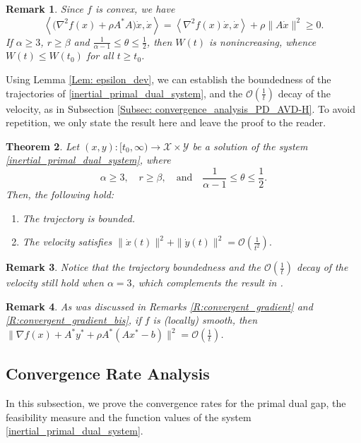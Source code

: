 \documentclass[pdflatex,sn-mathphys-num]{sn-jnl}
\theoremstyle{thmstyleone}
\newtheorem{theorem}{Theorem}
\theoremstyle{thmstyletwo}
\newtheorem{remark}[theorem]{Remark}
\theoremstyle{thmstylethree}
\newcommand{\X}{\mathcal{X}}
\newcommand{\Y}{\mathcal{Y}}
\begin{document}
\begin{remark}\label{Rem: epsilon_dev_bound}
Since $f$ is convex, we have 
$$ \left\langle \big( \nabla^2 f(x) + \rho A^* A \big)\dot{x}, \dot{x} \right\rangle 
= \left\langle \nabla^2 f(x) \dot{x}, \dot{x} \right\rangle + \rho \| A\dot{x} \|^2 \ge 0.$$
If $\alpha\ge 3$, $r\ge\beta$ and $\frac{1}{\alpha-1}\le \theta \le \frac{1}{2}$, then $W(t)$ is nonincreasing, whence $W(t)\le W(t_0)$ for all $t\ge t_0$.
\end{remark}


Using Lemma \ref{Lem: epsilon_dev}, we can establish the boundedness of the trajectories of \eqref{inertial_primal_dual_system}, and the $\mathcal{O}(\frac{1}{t})$ decay of the velocity, as in Subsection \ref{Subsec: convergence_analysis_PD_AVD-H}. To avoid repetition, we only state the result here and leave the proof to the reader.

\begin{theorem}
Let $(x,y):[t_0,\infty)\to\X\times\Y$ be a solution of the system \eqref{inertial_primal_dual_system}, where
$$\alpha\ge 3,\quad r\ge \beta,\quad\text{and}\quad \frac{1}{\alpha-1}\le\theta\le \frac{1}{2}.$$
Then, the following hold:
\begin{enumerate}[label=(\roman*), itemsep=0.7em, leftmargin=12mm]
\item The trajectory is bounded.

\item The velocity satisfies $\| \dot{x}(t) \|^2 + \| \dot{y}(t) \|^2   = \mathcal{O}\left( \frac{1}{t^2} \right).$ 
\end{enumerate}
\end{theorem}


\begin{remark}
Notice that the trajectory boundedness and the $\mathcal{O}\left( \frac{1}{t} \right)$ decay of the velocity still hold when $\alpha=3$, which complements the result in \cite{Zeng_2023,Radu_2021}.
\end{remark}

\begin{remark}
    As was discussed in Remarks \ref{R:convergent_gradient} and \ref{R:convergent_gradient_bis}, if $f$ is (locally) smooth, then $\|\nabla f(x) + A^* y^* + \rho A^*(Ax^*-b)\|^2=\mathcal{O}(\frac{1}{t})$.
\end{remark}


\subsection{Convergence Rate Analysis}
In this subsection, we prove the convergence rates for the primal dual gap, the feasibility measure and the function values of the system \eqref{inertial_primal_dual_system}.
\end{document}
